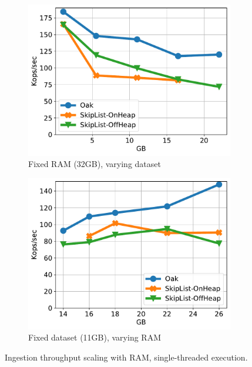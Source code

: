 \begin{figure}[tb]
\centering
\begin{subfigure}[b]{0.33\linewidth}
\includegraphics[width=\textwidth]{figs/Ingestion.pdf}
\caption{Fixed RAM (32GB), varying dataset}
\label{fig:ingest:fixed_ram}
\end{subfigure}
\hspace{0.1\linewidth}
\begin{subfigure}[b]{0.33\linewidth}
\includegraphics[width=\textwidth]{figs/rev_Ingestion.pdf}
\caption{Fixed dataset (11GB), varying RAM}
\label{fig:ingest:fixed_data}
\end{subfigure}
\caption{Ingestion throughput scaling with RAM, single-threaded execution.}
\label{fig:memscale:ingestion}
\end{figure}

